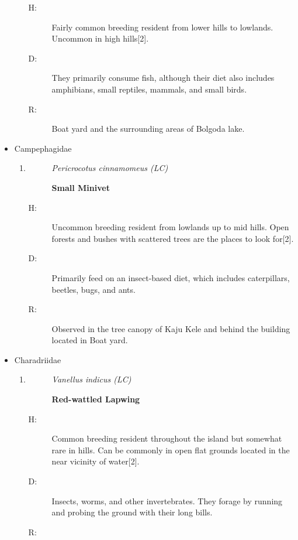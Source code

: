 \begin{itemize}
\begin{enumerate}
\begin{description}%
\item[H: ]%
Fairly common breeding resident from lower hills to lowlands. Uncommon in high hills{[}2{]}.%
\item[D: ]%
They primarily consume fish, although their diet also includes amphibians, small reptiles, mammals, and small birds.%
\item[R: ]%
Boat yard and the surrounding areas of Bolgoda lake.%
\end{description}%
\end{enumerate}%
\item%
Campephagidae%
\begin{enumerate}%
\item%
\begin{description}%
\item[]%
\textit{Pericrocotus cinnamomeus (LC)}%
\item[]%
\textbf{Small Minivet}%
\end{description}%
\begin{description}%
\item[H: ]%
Uncommon breeding resident from lowlands up to mid hills. Open forests and bushes with scattered trees are the places to look for{[}2{]}.%
\item[D: ]%
Primarily feed on an insect{-}based diet, which includes caterpillars, beetles, bugs, and ants.%
\item[R: ]%
Observed in the tree canopy of Kaju Kele and behind the building located in Boat yard.%
\end{description}%
\end{enumerate}%
\item%
Charadriidae%
\begin{enumerate}%
\item%
\begin{description}%
\item[]%
\textit{Vanellus indicus (LC)}%
\item[]%
\textbf{Red{-}wattled Lapwing}%
\end{description}%
\begin{description}%
\item[H: ]%
Common breeding resident throughout the island but somewhat rare in hills. Can be commonly in open flat grounds located in the near vicinity of water{[}2{]}.%
\item[D: ]%
Insects, worms, and other invertebrates. They forage by running and probing the ground with their long bills.%
\item[R: ]%

\end{description}
\end{enumerate}
\end{itemize}
